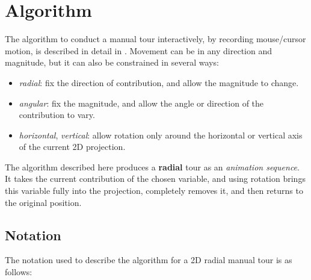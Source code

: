 \documentclass{monashthesis}
\begin{document}
\hypertarget{sec:algorithm}{%
\section{Algorithm}\label{sec:algorithm}}

The algorithm to conduct a manual tour interactively, by recording mouse/cursor motion, is described in detail in \textcite{cook_manual_1997}. Movement can be in any direction and magnitude, but it can also be constrained in several ways:

\begin{itemize}
\tightlist
\item
  \emph{radial}: fix the direction of contribution, and allow the magnitude to change.
\item
  \emph{angular}: fix the magnitude, and allow the angle or direction of the contribution to vary.
\item
  \emph{horizontal}, \emph{vertical}: allow rotation only around the horizontal or vertical axis of the current 2D projection.
\end{itemize}

The algorithm described here produces a \textbf{radial} tour as an \emph{animation sequence}. It takes the current contribution of the chosen variable, and using rotation brings this variable fully into the projection, completely removes it, and then returns to the original position.

\hypertarget{notation}{%
\subsection{Notation}\label{notation}}

The notation used to describe the algorithm for a 2D radial manual tour is as follows:
\end{document}
